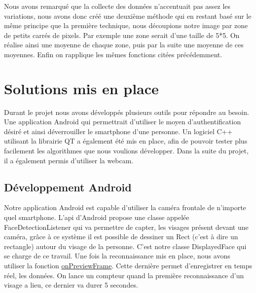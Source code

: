 Nous avons remarqué que la collecte des données n'accentuait pas assez les variations, nous avons donc créé une deuxième méthode qui en restant basé sur le même principe que la première technique, nous découpions notre image
par zone de petits carrés de pixels. Par exemple une zone serait d'une taille de 5*5. On réalise 
ainsi une moyenne de chaque zone, puis par la suite une moyenne de ces moyennes. Enfin on rapplique
les mêmes fonctions citées précédemment.

\section{Solutions mis en place}

Durant le projet nous avons développés plusieurs outils pour répondre au besoin. Une application Android qui permettrait d'utiliser le moyen d'authentification désiré et ainsi déverrouiller le smartphone d'une
personne. Un logiciel C++ utilisant la librairie QT a également été mis en place, afin de pouvoir tester plus facilement les algorithmes que nous voulions développer. Dans la suite du projet, il a également
permis d'utiliser la webcam. 

\subsection{Développement Android}

	Notre application Android est capable d'utiliser la caméra frontale de n'importe quel smartphone. L'api d'Android propose une classe appelée FaceDetectionListener qui va permettre de capter, les visages 
présent devant une caméra, grâce à ce système il est possible de dessiner un Rect (c'est à dire un rectangle) autour du visage de la personne. C'est notre classe DisplayedFace qui se charge de ce travail. 
Une fois la reconnaissance mis en place, nous avons utiliser la fonction 
\href{http://developer.android.com/reference/android/hardware/Camera.PreviewCallback.html#onPreviewFrame\%28byte\%5B\%5D,\%20android.hardware.Camera\%29}{onPreviewFrame}. Cette dernière permet d'enregistrer
en temps réel, les données. On lance un compteur quand la première reconnaissance d'un visage a lieu, ce dernier va durer 5 secondes.\\

